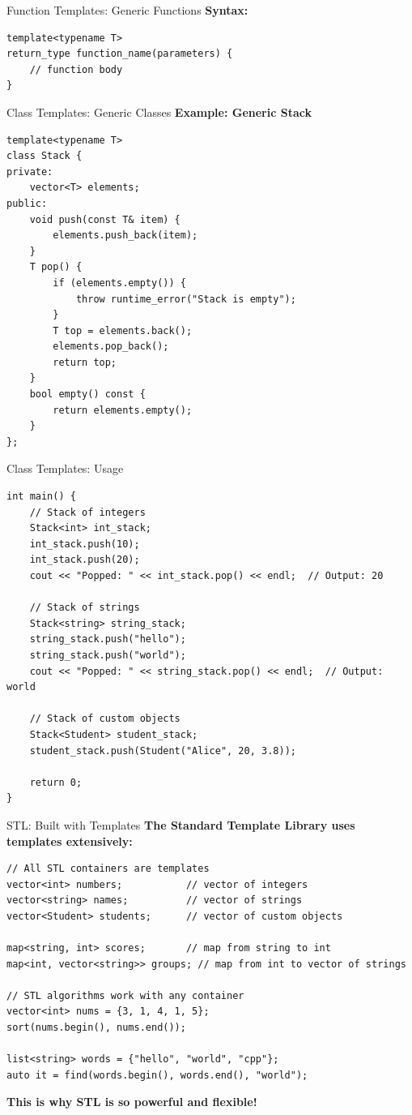 \begin{frame}[fragile]{Function Templates: Generic Functions}
	\textbf{Syntax:}
	\begin{verbatim}
template<typename T>
return_type function_name(parameters) {
    // function body
}
    \end{verbatim}
\end{frame}

\begin{frame}[fragile]{Class Templates: Generic Classes}
	\textbf{Example: Generic Stack}
	\begin{verbatim}
template<typename T>
class Stack {
private:
    vector<T> elements;
public:
    void push(const T& item) {
        elements.push_back(item);
    }
    T pop() {
        if (elements.empty()) {
            throw runtime_error("Stack is empty");
        }
        T top = elements.back();
        elements.pop_back();
        return top;
    }
    bool empty() const {
        return elements.empty();
    }
};
    \end{verbatim}
\end{frame}

\begin{frame}[fragile]{Class Templates: Usage}
	\begin{verbatim}
int main() {
    // Stack of integers
    Stack<int> int_stack;
    int_stack.push(10);
    int_stack.push(20);
    cout << "Popped: " << int_stack.pop() << endl;  // Output: 20

    // Stack of strings
    Stack<string> string_stack;
    string_stack.push("hello");
    string_stack.push("world");
    cout << "Popped: " << string_stack.pop() << endl;  // Output: world

    // Stack of custom objects
    Stack<Student> student_stack;
    student_stack.push(Student("Alice", 20, 3.8));

    return 0;
}
    \end{verbatim}
\end{frame}

\begin{frame}[fragile]{STL: Built with Templates}
	\textbf{The Standard Template Library uses templates extensively:}
	\begin{verbatim}
// All STL containers are templates
vector<int> numbers;           // vector of integers
vector<string> names;          // vector of strings
vector<Student> students;      // vector of custom objects

map<string, int> scores;       // map from string to int
map<int, vector<string>> groups; // map from int to vector of strings

// STL algorithms work with any container
vector<int> nums = {3, 1, 4, 1, 5};
sort(nums.begin(), nums.end());

list<string> words = {"hello", "world", "cpp"};
auto it = find(words.begin(), words.end(), "world");
    \end{verbatim}

	\textbf{This is why STL is so powerful and flexible!}
\end{frame}


